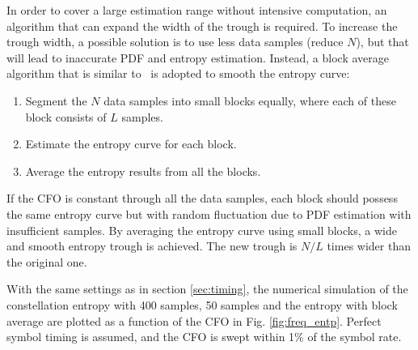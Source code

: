 \documentclass[journal,comsoc,onecolumn, 12pt,draftclsnofoot]{IEEEtran}
\begin{document}
In order to cover a large estimation range without intensive computation, an algorithm that can expand the width of the trough is required.
To increase the trough width, a possible solution is to use less data samples (reduce \(N\)), but that will lead to inaccurate PDF and entropy estimation.
Instead, a block average algorithm that is similar to~\cite{YuanlingHuang2007} is adopted to smooth the entropy curve:
\begin{enumerate}
\item Segment the \(N\) data samples into small blocks equally, where each of these block consists of \(L\) samples. 
\item Estimate the entropy curve for each block.
\item Average the entropy results from all the blocks.
\end{enumerate}
If the CFO is constant through all the data samples, each block should possess the same entropy curve but with random fluctuation due to PDF estimation with insufficient samples.
By averaging the entropy curve using small blocks, a wide and smooth entropy trough is achieved.
The new trough is $N/L$ times wider than the original one.

With the same settings as in section \ref{sec:timing}, the numerical simulation of the constellation entropy with 400 samples, 50 samples and the entropy with block average are plotted as a function of the CFO in Fig. \ref{fig:freq_entp}.
Perfect symbol timing is assumed, and the CFO is swept within 1\% of the symbol rate.


\end{document}
